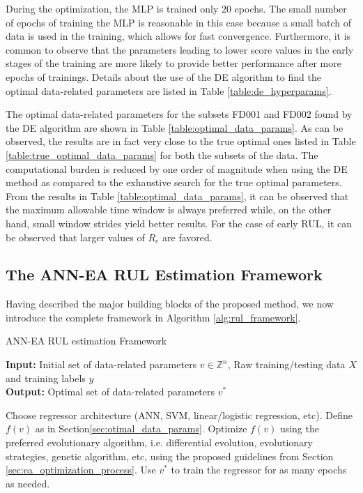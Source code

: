 \documentclass[12pt]{IEEEtran}%
\begin{document}
During the optimization, the MLP is trained only $20$ epochs. The small number
of epochs of training the MLP is reasonable in this case because a small batch
of data is used in the training, which allows for fast convergence.
Furthermore, it is common to observe that the parameters leading to lower
score values in the early stages of the training are more likely to provide
better performance after more epochs of trainings. Details about the use of
the DE algorithm to find the optimal data-related parameters are listed in
Table \ref{table:de_hyperparams}.

The optimal data-related parameters for the subsets FD001 and FD002 found by
the DE algorithm are shown in Table \ref{table:optimal_data_params}. As can be
observed, the results are in fact very close to the true optimal ones listed
in Table \ref{table:true_optimal_data_params} for both the subsets of the
data. The computational burden is reduced by one order of magnitude when using
the DE method as compared to the exhaustive search for the true optimal
parameters. From the results in Table \ref{table:optimal_data_params}, it can
be observed that the maximum allowable time window is always preferred while,
on the other hand, small window strides yield better results. For the case of
early RUL, it can be observed that larger values of $R_{e}$ are favored.

\subsection{The ANN-EA RUL Estimation Framework}

Having described the major building blocks of the proposed method, we now
introduce the complete framework in Algorithm \ref{alg:rul_framework}.

\setcounter{algorithm}{0} \begin{algorithm}[H]
\caption{ANN-EA RUL estimation Framework}\label{alg:rul_framework}
\textbf{Input:} Initial set of data-related parameters $v \in \mathbb{Z}^n$, Raw training/testing data $X$ and training labels $y$\\
\textbf{Output:} Optimal set of data-related parameters $v^*$
\begin{algorithmic}[1]
\State Choose regressor architecture (ANN, SVM, linear/logistic regression, etc).
\State Define $f(v)$ as in Section\ref{sec:otimal_data_params}.
\State Optimize $f(v)$ using the preferred evolutionary algorithm, i.e. differential evolution, evolutionary strategies, genetic algorithm, etc, using the proposed guidelines from Section \ref{sec:ea_optimization_process}.
\State Use $v^*$ to train the regressor for as many epochs as needed.
\end{algorithmic}
\end{algorithm}
\end{document}
